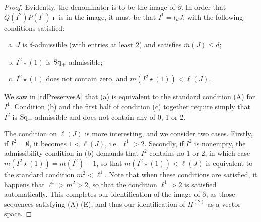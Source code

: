 \documentclass[10pt]{article}
\renewcommand{\Q}{Q}
\newcommand{\SqShift}{\Sq_{\smash{+}}}
\newcommand{\Sq}{\mathrm{Sq}}
\newcommand{\minDim}{m}
\newcommand{\minDimP}{\overline{m}}
\begin{document}
\begin{CalculatingRepeatedKoszul}
\begin{proof}
Evidently, the denominator is to be the image of $\partial$. In order that $\Q(I^2)P(I^1)\imath$ is in the image, it must be that $I^1=t_dJ$, with the following conditions satisfied:
\begin{enumerate}[(a)]
\squishlist
\setlength{\parindent}{.25in}
\item $J$ is $\delta$-admissible (with entries at least 2) and satisfies $\minDimP(J)\leq d$;
\item $I^2\star(1)$ is $\SqShift$-admissible;
\item $I^2\star(1)$ does not contain zero, and $\minDim(I^2\star(1))<\ell(J)$.
\end{enumerate}
We saw in \ref{tdPreservesA} that (a) is equivalent to the standard condition \textup{(A)} for $I^1$. Condition (b) and the first half of condition (c) together require simply that $I^2$ is $\SqShift$-admissible and does not contain any of 0, 1 or 2.

The condition on $\ell(J)$ is more interesting, and we consider two cases. Firstly, if $I^2=\emptyset$, it becomes $1<\ell(J)$, i.e.\ $\ell^1>2$. Secondly, if $I^2$ is nonempty, the admissibility condition in (b) demands that $I^2$ contains no 1 or 2, in which case $\minDim(I^2\star(1))=\minDim(I^2)-1$, so that $\minDim(I^2\star(1))<\ell(J)$ is equivalent to the standard condition $\minDim^2<\ell^1$. Note that when these conditions are satisfied, it happens that $\ell^1>m^2>2$, so that the condition $\ell^1>2$ is satisfied automatically. %
This completes our identification of the image of $\partial$, as those sequences satisfying \textup{(A)}-\textup{(E)}, and thus our identification of $H^{(2)}$ as a vector space.




\end{proof}
\end{CalculatingRepeatedKoszul}
\end{document}
